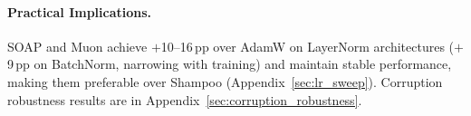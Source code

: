 \paragraph{Practical Implications.}
SOAP and Muon achieve $+$10--16\,pp over AdamW on LayerNorm architectures ($+$9\,pp on BatchNorm, narrowing with training) and maintain stable performance, making them preferable over Shampoo (Appendix~\ref{sec:lr_sweep}).
Corruption robustness results are in Appendix~\ref{sec:corruption_robustness}.
